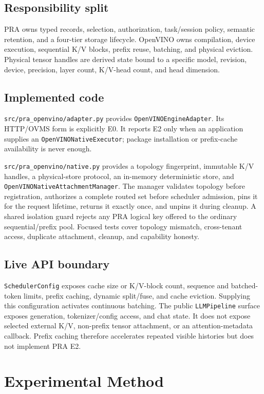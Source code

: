 \documentclass[10pt]{article}
\begin{document}
\subsection{Responsibility split}
PRA owns typed records, selection, authorization, task/session policy, semantic
retention, and a four-tier storage lifecycle. OpenVINO owns compilation,
device execution, sequential K/V blocks, prefix reuse, batching, and physical
eviction. Physical tensor handles are derived state bound to a specific model,
revision, device, precision, layer count, K/V-head count, and head dimension.

\subsection{Implemented code}
\texttt{src/pra\_openvino/adapter.py} provides
\texttt{OpenVINOEngineAdapter}. Its HTTP/OVMS form is explicitly E0. It reports
E2 only when an application supplies an \texttt{OpenVINONativeExecutor};
package installation or prefix-cache availability is never enough.

\texttt{src/pra\_openvino/native.py} provides a topology fingerprint,
immutable K/V handles, a physical-store protocol, an in-memory deterministic
store, and \texttt{OpenVINONativeAttachmentManager}. The manager validates
topology before registration, authorizes a complete routed set before
scheduler admission, pins it for the request lifetime, returns it exactly
once, and unpins it during cleanup. A shared isolation guard rejects any PRA
logical key offered to the ordinary sequential/prefix pool. Focused tests cover
topology mismatch, cross-tenant access, duplicate attachment, cleanup, and
capability honesty.

\subsection{Live API boundary}
\texttt{SchedulerConfig} exposes cache size or K/V-block count, sequence and
batched-token limits, prefix caching, dynamic split/fuse, and cache eviction.
Supplying this configuration activates continuous batching. The public
\texttt{LLMPipeline} surface exposes generation, tokenizer/config access, and
chat state. It does not expose selected external K/V, non-prefix tensor
attachment, or an attention-metadata callback. Prefix caching therefore
accelerates repeated visible histories but does not implement PRA E2.

\section{Experimental Method}
\end{document}
